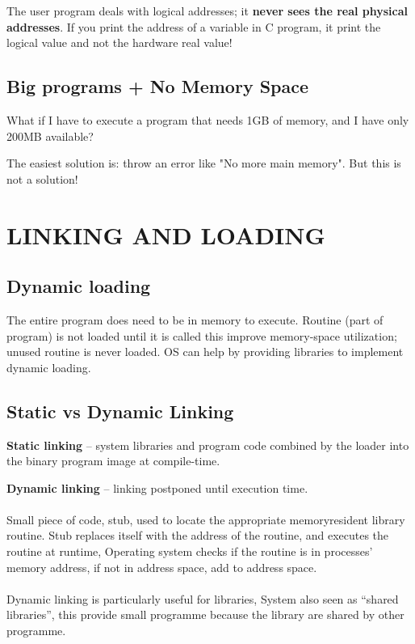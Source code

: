 The user program deals with logical addresses; it \textbf{never sees the real physical addresses}. If you print the address of a variable in C program, it print the logical value and not the hardware real value!

\newpage
\subsection{Big programs + No Memory Space}
What if I have to execute a program that needs 1GB of memory, and I have only 200MB available?

The easiest solution is: throw an error like "No more main memory". But this is not a solution!

\section{LINKING AND LOADING}

\subsection{Dynamic loading}
The entire program does need to be in memory to execute. Routine (part of program) is not loaded until it is called this improve memory-space utilization; unused routine is never loaded. OS can help by providing libraries to implement dynamic loading.

\subsection{Static vs Dynamic Linking}
\textbf{Static linking} – system libraries and program code combined by the loader into the binary program image at compile-time.


\textbf{Dynamic linking} – linking postponed until execution time.
\paragraph{}
Small piece of code, stub, used to locate the appropriate memoryresident library routine. Stub replaces itself with the address of the routine, and executes the
routine at runtime, Operating system checks if the routine is in processes’ memory address, if not in address space, add to address space.

\paragraph{}
Dynamic linking is particularly useful for libraries, System also seen as “shared libraries”, this provide small programme because the library are shared by other programme.

